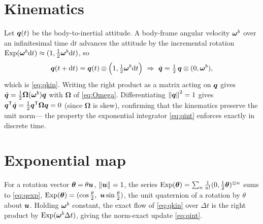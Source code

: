 \section*{Kinematics}

Let $\bm{q}(t)$ be the body-to-inertial attitude. A body-frame angular velocity
$\bm{\omega}^{b}$ over an infinitesimal time $\mathrm dt$ advances the attitude by
the incremental rotation $\operatorname{Exp}(\bm{\omega}^{b}\mathrm dt)\approx(1,\tfrac12\bm{\omega}^{b}\mathrm dt)$,
so
\begin{equation}
\bm{q}(t+\mathrm dt)=\bm{q}(t)\otimes\Bigl(1,\tfrac12\bm{\omega}^{b}\mathrm dt\Bigr)
\ \Rightarrow\
\dot{\bm{q}}=\tfrac12\,\bm{q}\otimes(0,\bm{\omega}^{b}),
\end{equation}
which is \cref{eq:qkin}. Writing the right product as a matrix acting on
$\bm{q}$ gives $\dot{\bm{q}}=\tfrac12\bm{\Omega}(\bm{\omega}^{b})\bm{q}$ with
$\bm{\Omega}$ of \cref{eq:Omega}. Differentiating $\left\lVert \bm{q} \right\rVert^2=1$ gives
$\bm{q}^{\mathsf{T}}\dot{\bm{q}}=\tfrac12\bm{q}^{\mathsf{T}}\bm{\Omega}\bm{q}=0$ (since
$\bm{\Omega}$ is skew), confirming that the kinematics preserve the unit norm---%
the property the exponential integrator \cref{eq:qint} enforces exactly in
discrete time.

\section*{Exponential map}

For a rotation vector $\bm{\theta}=\theta\bm{u}$, $\left\lVert \bm{u} \right\rVert=1$, the series
$\operatorname{Exp}(\bm{\theta})=\sum_{n}\tfrac1{n!}(0,\tfrac12\bm{\theta})^{\otimes n}$ sums to
\cref{eq:qexp},
$\Exp(\vv{\theta})=(\cos\tfrac\theta2,\ \vv{u}\sin\tfrac\theta2)$, the unit
quaternion of a rotation by $\theta$ about $\bm{u}$. Holding $\bm{\omega}^{b}$
constant, the exact flow of \cref{eq:qkin} over $\Delta t$ is the right product by
$\operatorname{Exp}(\bm{\omega}^{b}\Delta t)$, giving the norm-exact update \cref{eq:qint}.
